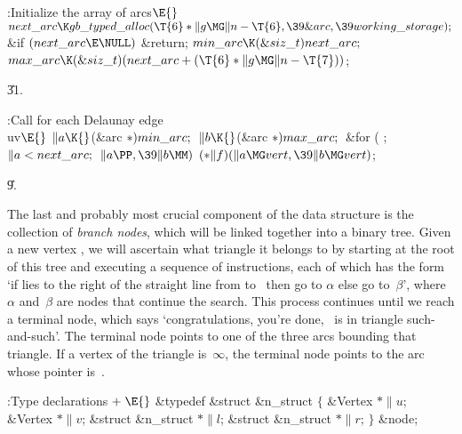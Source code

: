 \B{}:Initialize the array of arcs\X${}\E{}$\6
$\\{next\_arc}\K\\{gb\_typed\_alloc}(\T{6}*\|g\MG\|n-\T{6},\39\&{arc},\39%
\\{working\_storage});{}$\6
\&{if} ${}(\\{next\_arc}\E\NULL){}$\1\5
\&{return};\2\6
${}\\{min\_arc}\K(\&{siz\_t})\,\\{next\_arc};{}$\6
${}\\{max\_arc}\K(\&{siz\_t})(\\{next\_arc}+(\T{6}*\|g\MG\|n-\T{7})){}$;\par
\U31.\fi

\B{}:Call  for each Delaunay edge \\{uv}\X${}\E{}$\6
$\|a\K{}$(\&{arc} ${}{*})\,\\{min\_arc};{}$\6
${}\|b\K{}$(\&{arc} ${}{*})\,\\{max\_arc};{}$\6
\&{for} ( ; ${}\|a<\\{next\_arc};{}$ ${}\|a\PP,\39\|b\MM){}$\1\5
${}({*}\|f)(\|a\MG\\{vert},\39\|b\MG\\{vert}){}$;\2\par
\U9.\fi

The last and probably most crucial component of the data structure
is the collection of {\sl branch nodes}, which will be linked together
into a binary tree.  Given a new vertex , we will ascertain what
triangle it belongs to by starting at the root of this tree and
executing a sequence of instructions, each of which has the form `if
 lies to the right of the straight line from  to~ then
go to
$\alpha$ else go to~$\beta$', where $\alpha$ and~$\beta$ are nodes
that continue the search. This process continues until we reach a
terminal node, which says `congratulations, you're done, ~is in
triangle such-and-such'. The terminal node points to one of the three
arcs bounding that triangle. If a vertex of the triangle is~$\infty$,
the terminal node points to the arc whose  pointer is~\PB{$%
\NULL$}.

\Y\B\4:Type declarations\X${}\mathrel+\E{}$\6
\&{typedef} \&{struct} \&{n\_struct} ${}\{{}$\1\6
\&{Vertex} ${}{*}\|u{}$;\6
\&{Vertex} ${}{*}\|v{}$;\6
\&{struct} \&{n\_struct} ${}{*}\|l{}$;\6
\&{struct} \&{n\_struct} ${}{*}\|r{}$;\2\6
${}\}{}$ \&{node};\par
\fi

